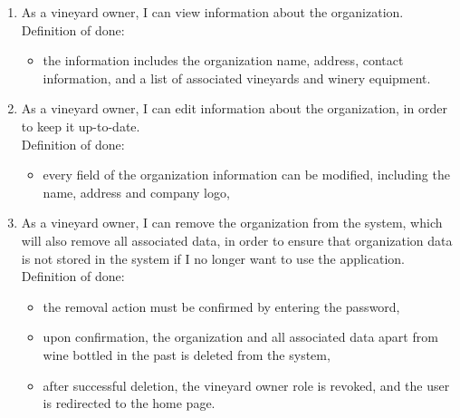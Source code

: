 \begin{enumerate}
	\item As a vineyard owner, I can view information about the organization.
	\\Definition of done:
	\begin{itemize}
		\item the information includes the organization name, address, contact information, and a list of associated vineyards and winery equipment.
	\end{itemize}
	
	\item As a vineyard owner, I can edit information about the organization, in order to keep it up-to-date.
	\\Definition of done:
	\begin{itemize}
		\item every field of the organization information can be modified, including the name, address and company logo,
	\end{itemize}
	
	\item As a vineyard owner, I can remove the organization from the system, which will also remove all associated data, in order to ensure that organization data is not stored in the system if I no longer want to use the application.
	\\Definition of done:
	\begin{itemize}
		\item the removal action must be confirmed by entering the password,
		\item upon confirmation, the organization and all associated data apart from wine bottled in the past is deleted from the system,
		\item after successful deletion, the vineyard owner role is revoked, and the user is redirected to the home page.
	\end{itemize}
	

\end{enumerate}
